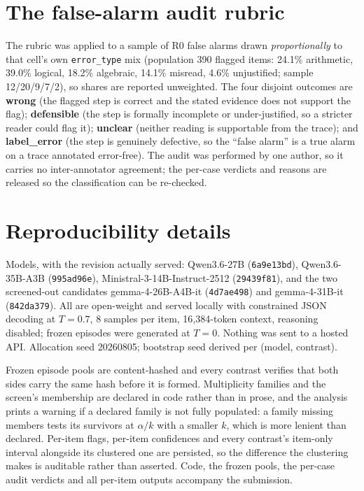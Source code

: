 \documentclass[11pt]{article}
\begin{document}
\section{The false-alarm audit rubric}
\label{app:rubric}

The rubric was applied to a sample of R0 false alarms drawn \emph{proportionally} to that cell's own
\texttt{error\_type} mix (population 390 flagged items: 24.1\% arithmetic, 39.0\% logical, 18.2\%
algebraic, 14.1\% misread, 4.6\% unjustified; sample 12/20/9/7/2), so shares are reported unweighted. The four disjoint outcomes are \textbf{wrong}
(the flagged step is correct and the stated evidence does not support the flag); \textbf{defensible}
(the step is formally incomplete or under-justified, so a stricter reader could flag it);
\textbf{unclear} (neither reading is supportable from the trace); and \textbf{label\_error} (the step
is genuinely defective, so the ``false alarm'' is a true alarm on a
trace annotated error-free). The audit was performed by one author, so it carries no
inter-annotator agreement; the per-case verdicts and reasons are released so the classification can be
re-checked.

\section{Reproducibility details}
\label{app:repro}

Models, with the revision actually served: Qwen3.6-27B (\texttt{6a9e13bd}), Qwen3.6-35B-A3B
(\texttt{995ad96e}), Ministral-3-14B-Instruct-2512 (\texttt{29439f81}), and the two screened-out
candidates gemma-4-26B-A4B-it (\texttt{4d7ae498}) and gemma-4-31B-it (\texttt{842da379}). All are
open-weight and served locally with constrained JSON decoding at $T{=}0.7$, 8 samples per item,
16{,}384-token context, reasoning disabled; frozen episodes were generated at $T{=}0$. Nothing was
sent to a hosted API. Allocation seed 20260805; bootstrap seed derived per (model, contrast).

Frozen episode pools are content-hashed and every contrast verifies that both sides carry
the same hash before it is formed. Multiplicity families and the screen's membership are declared in
code rather than in prose, and the analysis prints a warning if a declared family is not fully
populated: a family missing members tests its survivors at $\alpha/k$ with a smaller $k$, which is
more lenient than declared. Per-item flags, per-item confidences and every contrast's item-only
interval alongside its clustered one are persisted, so the difference the clustering makes is auditable
rather than asserted. Code, the frozen pools, the per-case audit verdicts and all per-item outputs
accompany the submission.
\end{document}
